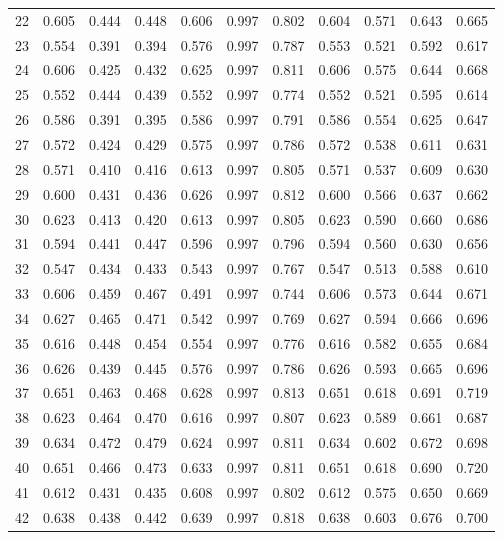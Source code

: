\begin{longtable}[p]{|c|c|c|c|c|c|c|c|c|c|c|}
	22 & 0.605 & 0.444 & 0.448 & 0.606 & 0.997 & 0.802 & 0.604 & 0.571 & 0.643 & 0.665 \\
	23 & 0.554 & 0.391 & 0.394 & 0.576 & 0.997 & 0.787 & 0.553 & 0.521 & 0.592 & 0.617 \\
	24 & 0.606 & 0.425 & 0.432 & 0.625 & 0.997 & 0.811 & 0.606 & 0.575 & 0.644 & 0.668 \\
	25 & 0.552 & 0.444 & 0.439 & 0.552 & 0.997 & 0.774 & 0.552 & 0.521 & 0.595 & 0.614 \\
	26 & 0.586 & 0.391 & 0.395 & 0.586 & 0.997 & 0.791 & 0.586 & 0.554 & 0.625 & 0.647 \\
	27 & 0.572 & 0.424 & 0.429 & 0.575 & 0.997 & 0.786 & 0.572 & 0.538 & 0.611 & 0.631 \\
	28 & 0.571 & 0.410 & 0.416 & 0.613 & 0.997 & 0.805 & 0.571 & 0.537 & 0.609 & 0.630 \\
	29 & 0.600 & 0.431 & 0.436 & 0.626 & 0.997 & 0.812 & 0.600 & 0.566 & 0.637 & 0.662 \\
	30 & 0.623 & 0.413 & 0.420 & 0.613 & 0.997 & 0.805 & 0.623 & 0.590 & 0.660 & 0.686 \\
	31 & 0.594 & 0.441 & 0.447 & 0.596 & 0.997 & 0.796 & 0.594 & 0.560 & 0.630 & 0.656 \\
	32 & 0.547 & 0.434 & 0.433 & 0.543 & 0.997 & 0.767 & 0.547 & 0.513 & 0.588 & 0.610 \\
	33 & 0.606 & 0.459 & 0.467 & 0.491 & 0.997 & 0.744 & 0.606 & 0.573 & 0.644 & 0.671 \\
	34 & 0.627 & 0.465 & 0.471 & 0.542 & 0.997 & 0.769 & 0.627 & 0.594 & 0.666 & 0.696 \\
	35 & 0.616 & 0.448 & 0.454 & 0.554 & 0.997 & 0.776 & 0.616 & 0.582 & 0.655 & 0.684 \\
	36 & 0.626 & 0.439 & 0.445 & 0.576 & 0.997 & 0.786 & 0.626 & 0.593 & 0.665 & 0.696 \\
	37 & 0.651 & 0.463 & 0.468 & 0.628 & 0.997 & 0.813 & 0.651 & 0.618 & 0.691 & 0.719 \\
	38 & 0.623 & 0.464 & 0.470 & 0.616 & 0.997 & 0.807 & 0.623 & 0.589 & 0.661 & 0.687 \\
	39 & 0.634 & 0.472 & 0.479 & 0.624 & 0.997 & 0.811 & 0.634 & 0.602 & 0.672 & 0.698 \\
	40 & 0.651 & 0.466 & 0.473 & 0.633 & 0.997 & 0.811 & 0.651 & 0.618 & 0.690 & 0.720 \\
	41 & 0.612 & 0.431 & 0.435 & 0.608 & 0.997 & 0.802 & 0.612 & 0.575 & 0.650 & 0.669 \\
	42 & 0.638 & 0.438 & 0.442 & 0.639 & 0.997 & 0.818 & 0.638 & 0.603 & 0.676 & 0.700 \\

\end{longtable}
